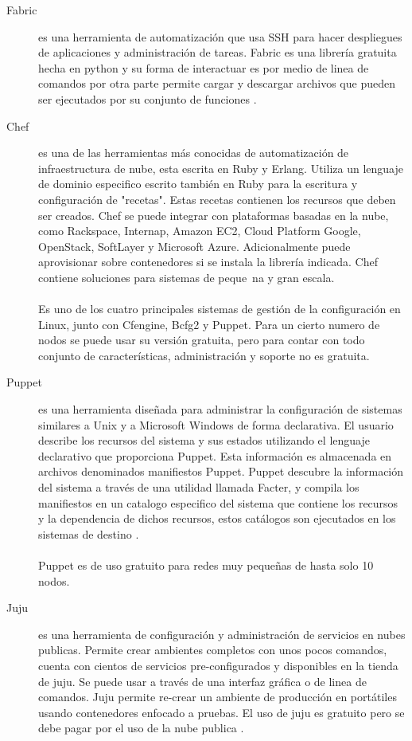 \begin{description}
\item [Fabric]
 es una herramienta de automatización que usa SSH para hacer despliegues de aplicaciones y administración de tareas. Fabric es una librería gratuita hecha en python y su forma de interactuar es por medio de linea de comandos por otra parte permite cargar y descargar archivos que pueden ser ejecutados por su conjunto de funciones \cite{fabfile16}.

\item [Chef]
es una de las herramientas más conocidas de automatización de infraestructura de nube, esta escrita en Ruby y Erlang. Utiliza un lenguaje de dominio especifico escrito también en Ruby para la escritura y configuración de "recetas". Estas recetas contienen los recursos que deben ser creados. Chef se puede integrar con plataformas basadas en la nube, como Rackspace, Internap, Amazon EC2, Cloud Platform Google, OpenStack, SoftLayer y Microsoft Azure. Adicionalmente puede aprovisionar sobre contenedores si se instala la librería indicada. Chef contiene soluciones para sistemas de peque~na y gran escala. \cite{Chef15}\\
\\
Es uno de los cuatro principales sistemas de gestión de la configuración en Linux, junto con Cfengine, Bcfg2 y Puppet. Para un cierto numero de nodos se puede usar su versión gratuita, pero para contar con todo conjunto de características, administración y soporte no es gratuita.

\item [Puppet]
es una herramienta diseñada para administrar la configuración de sistemas similares a Unix y a Microsoft Windows de forma declarativa. El usuario describe los recursos del sistema y sus estados utilizando el lenguaje declarativo que proporciona Puppet. Esta información es almacenada en archivos denominados manifiestos Puppet. Puppet descubre la información del sistema a través de una utilidad llamada Facter, y compila los manifiestos en un catalogo especifico del sistema que contiene los recursos y la dependencia de dichos recursos, estos catálogos son ejecutados en los sistemas de destino \cite{Pupet15}.\\
\\
Puppet es de uso gratuito para redes muy pequeñas de hasta solo 10 nodos.

\item [Juju]
 es una herramienta de configuración y administración de servicios en nubes publicas. Permite crear ambientes completos con unos pocos comandos, cuenta con cientos de servicios pre-configurados y disponibles en la tienda de juju. Se puede usar a través de una interfaz gráfica o de linea de comandos. Juju permite re-crear un ambiente de producción en portátiles usando contenedores enfocado a pruebas. El uso de juju es gratuito pero se debe pagar por el uso de la nube publica \cite{juju16}.


\end{description}
